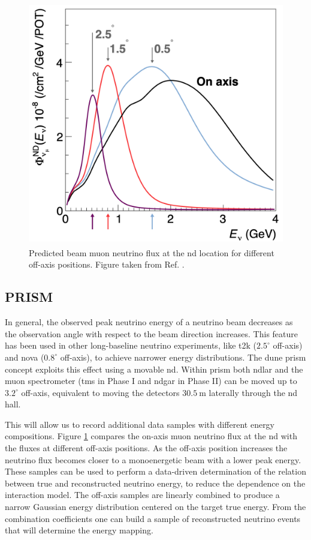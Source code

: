 \begin{figure}[t]
	\centering
	\includegraphics[width=0.55\linewidth]{Images/DUNE/ND/prism_spectra}
	\caption[Predicted beam muon neutrino flux at the \gls{nd} location for different off-axis positions.]{Predicted beam muon neutrino flux at the \gls{nd} location for different off-axis positions. Figure taken from Ref. \cite{DUNE2021NDCDR}.}
	\label{fig:dune_prism}
\end{figure}

\subsection{PRISM}

In general, the observed peak neutrino energy of a neutrino beam decreases as the observation angle with respect to the beam direction increases. This feature has been used in other long-baseline neutrino experiments, like \gls{t2k} ($2.5^{\circ}$ off-axis) and \gls{nova} ($0.8^{\circ}$ off-axis), to achieve narrower energy distributions. The \gls{dune} \gls{prism} concept exploits this effect using a movable \gls{nd}. Within \gls{prism} both \gls{ndlar} and the muon spectrometer (\gls{tms} in Phase I and \gls{ndgar} in Phase II) can be moved up to $3.2^{\circ}$ off-axis, equivalent to moving the detectors $30.5~\mathrm{m}$ laterally through the \gls{nd} hall.

This will allow us to record additional data samples with different energy compositions. Figure \ref{fig:dune_prism} compares the on-axis muon neutrino flux at the \gls{nd} with the fluxes at different off-axis positions. As the off-axis position increases the neutrino flux becomes closer to a monoenergetic beam with a lower peak energy. These samples can be used to perform a data-driven determination of the relation between true and reconstructed neutrino energy, to reduce the dependence on the interaction model. The off-axis samples are linearly combined to produce a narrow Gaussian energy distribution centered on the target true energy. From the combination coefficients one can build a sample of reconstructed neutrino events that will determine the energy mapping.

